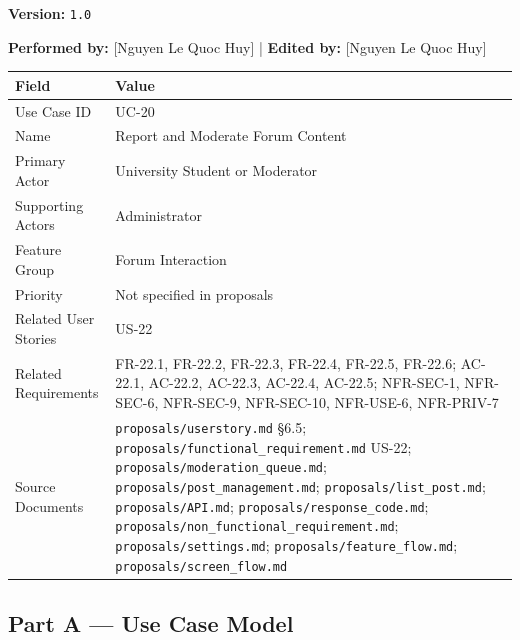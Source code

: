 \documentclass[12pt]{article}
\renewcommand{\baselinestretch}{1.5}
\begin{document}
\textbf{Version:} \texttt{1.0}
\par\medskip

\textbf{Performed by:} [Nguyen Le Quoc Huy] | \textbf{Edited by:} [Nguyen Le Quoc Huy]
\par\medskip

\begingroup
\small
\renewcommand{\baselinestretch}{1.0}\selectfont
\renewcommand{\arraystretch}{1.15}
\setlength{\tabcolsep}{6pt}
\begin{longtable}{|>{\raggedright\arraybackslash}p{}|>{\raggedright\arraybackslash}p{}|}
\hline
\textbf{Field} & \textbf{Value} \\ \hline
\endhead
Use Case ID & UC-20 \\ \hline
Name & Report and Moderate Forum Content \\ \hline
Primary Actor & University Student or Moderator \\ \hline
Supporting Actors & Administrator \\ \hline
Feature Group & Forum Interaction \\ \hline
Priority & Not specified in proposals \\ \hline
Related User Stories & US-22 \\ \hline
Related Requirements & FR-22.1, FR-22.2, FR-22.3, FR-22.4, FR-22.5, FR-22.6; AC-22.1, AC-22.2, AC-22.3, AC-22.4, AC-22.5; NFR-SEC-1, NFR-SEC-6, NFR-SEC-9, NFR-SEC-10, NFR-USE-6, NFR-PRIV-7 \\ \hline
Source Documents & \texttt{proposals/userstory.md} §6.5; \texttt{proposals/functional\_requirement.md} US-22; \texttt{proposals/moderation\_queue.md}; \texttt{proposals/post\_management.md}; \texttt{proposals/list\_post.md}; \texttt{proposals/API.md}; \texttt{proposals/response\_code.md}; \texttt{proposals/non\_functional\_requirement.md}; \texttt{proposals/settings.md}; \texttt{proposals/feature\_flow.md}; \texttt{proposals/screen\_flow.md} \\ \hline
\end{longtable}
\endgroup
\par\medskip

\hypertarget{sec:part-a-use-case-model}{}
\subsection*{Part A --- Use Case Model}
\par\medskip

\hypertarget{sec:a1-focused-use-case-diagram}{}
\end{document}
